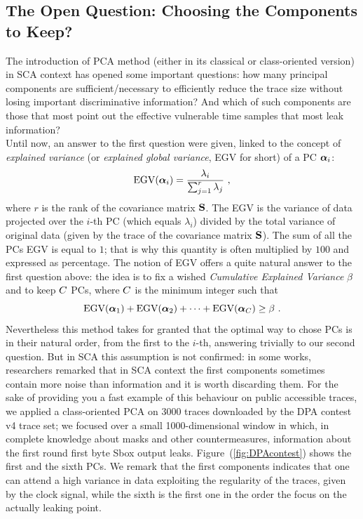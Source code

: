 \subsection{The Open Question: Choosing the Components to Keep?}
The introduction of PCA method (either in its classical or class-oriented version) in SCA context has opened some important questions: how many principal components are sufficient/necessary to efficiently reduce the trace size without losing important discriminative information? And which of such components are those that most point out the effective vulnerable time samples that most leak information?\\
Until now, an answer to the first question were given, linked to the concept of {\em explained variance} (or {\em explained global variance}, EGV for short) of a PC $\boldsymbol\alpha_i$:
\begin{equation}\label{eq:EGV}
\mathrm{EGV}(\boldsymbol\alpha_i) =  \frac{\lambda_i}{\sum_{j=1}^r\lambda_j} \mbox{ ,}
\end{equation}
where $r$ is the rank of the covariance matrix $\textbf{S}$. The EGV is the variance of data projected over the $i$-th PC (which equals $\lambda_i$) divided by the total variance of original data (given by the trace of the covariance matrix $\textbf{S}$). The sum of all the PCs EGV is equal to $1$; that is why this quantity is often multiplied by $100$ and expressed as percentage.
The notion of EGV offers a quite natural answer to the first question above: the idea is to fix a wished {\em Cumulative Explained Variance} $\beta$ and to keep $C$ PCs, where $C$ is the minimum integer such that
\begin{equation}
\mbox{EGV}(\boldsymbol\alpha_1) +\mbox{EGV}(\boldsymbol\alpha_2) + \dots +\mbox{EGV}(\boldsymbol\alpha_C) \geq \beta \mbox{ .}
\end{equation}
Nevertheless this method takes for granted that the optimal way to chose PCs is in their natural order, from the first to the $i$-th, answering trivially to our second question. But in SCA this assumption is not confirmed: in some works, researchers remarked that in SCA context the first components sometimes contain more noise than information and it is worth discarding them. For the sake of providing you a fast example of this behaviour on public accessible traces, we applied a class-oriented PCA on 3000 traces downloaded by the DPA contest v4 trace set; we focused over a small 1000-dimensional window in which, in complete knowledge about masks and other countermeasures, information about the first round first byte Sbox output leaks. Figure~(\ref{fig:DPAcontest}) shows the first and the sixth PCs. We remark that the first components indicates that one can attend a high variance in data exploiting the regularity of the traces, given by the clock signal, while the sixth is the first one in the order the focus on the actually leaking point.

